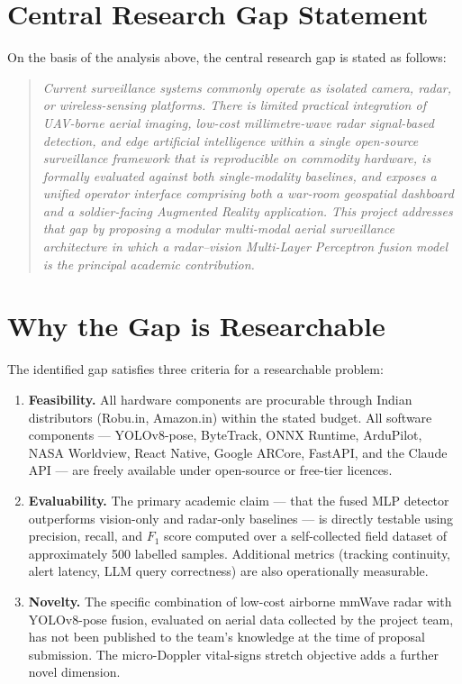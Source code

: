 \section{Central Research Gap Statement}
On the basis of the analysis above, the central research gap is stated as follows:

\begin{quote}
\itshape
Current surveillance systems commonly operate as isolated camera, radar, or wireless-sensing platforms. There is limited practical integration of UAV-borne aerial imaging, low-cost millimetre-wave radar signal-based detection, and edge artificial intelligence within a single open-source surveillance framework that is reproducible on commodity hardware, is formally evaluated against both single-modality baselines, and exposes a unified operator interface comprising both a war-room geospatial dashboard and a soldier-facing Augmented Reality application. This project addresses that gap by proposing a modular multi-modal aerial surveillance architecture in which a radar--vision Multi-Layer Perceptron fusion model is the principal academic contribution.
\end{quote}

\section{Why the Gap is Researchable}
The identified gap satisfies three criteria for a researchable problem:

\begin{enumerate}[label=(\arabic*).]
    \item \textbf{Feasibility.} All hardware components are procurable through Indian distributors (Robu.in, Amazon.in) within the stated budget. All software components --- YOLOv8-pose, ByteTrack, ONNX Runtime, ArduPilot, NASA Worldview, React Native, Google ARCore, FastAPI, and the Claude API --- are freely available under open-source or free-tier licences.

    \item \textbf{Evaluability.} The primary academic claim --- that the fused MLP detector outperforms vision-only and radar-only baselines --- is directly testable using precision, recall, and $F_1$ score computed over a self-collected field dataset of approximately 500 labelled samples. Additional metrics (tracking continuity, alert latency, LLM query correctness) are also operationally measurable.

    \item \textbf{Novelty.} The specific combination of low-cost airborne mmWave radar with YOLOv8-pose fusion, evaluated on aerial data collected by the project team, has not been published to the team's knowledge at the time of proposal submission. The micro-Doppler vital-signs stretch objective adds a further novel dimension.
\end{enumerate}


